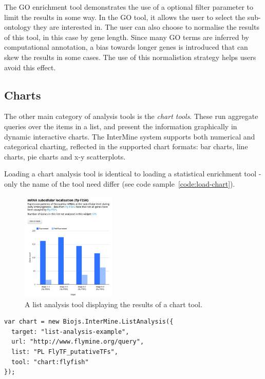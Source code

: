\documentclass[10pt,a4paper,twocolumn]{article}
\begin{document}
The GO enrichment tool demonstrates the use of a optional
filter parameter to limit the results in some way. In the GO tool, it allows the user to select the
sub-ontology they are interested in. The user can also choose to normalise the results
of this tool, in this case by gene length. Since many GO terms are inferred by
computational annotation, a bias towards longer genes is introduced that can skew the results in some cases. The use of this normalistion strategy
helps users avoid this effect.

\subsection*{Charts}

The other main category of analysis tools is the \emph{chart tools}. These run aggregate
queries over the items in a list, and present the information graphically in dynamic
interactive charts. The InterMine system supports both numerical and categorical charting,
reflected in the supported chart formats: bar charts, line charts, pie charts and x-y scatterplots.

Loading a chart analysis tool is identical to loading a statistical enrichment
tool - only the name of the tool need differ (see code sample~\ref{code:load-chart}).

\begin{figure}
\centering
\includegraphics[width=0.4\textwidth]{im-widgets-flyfish.png}
\caption{\label{fig:flyfish}A list analysis tool displaying the results of a chart tool.}
\end{figure}

\begin{lstlisting}[caption={Loading a chart list analysis tool.},label={code:load-chart}]
var chart = new Biojs.InterMine.ListAnalysis({
  target: "list-analysis-example",
  url: "http://www.flymine.org/query",
  list: "PL FlyTF_putativeTFs",
  tool: "chart:flyfish"
});
\end{lstlisting}
\end{document}

